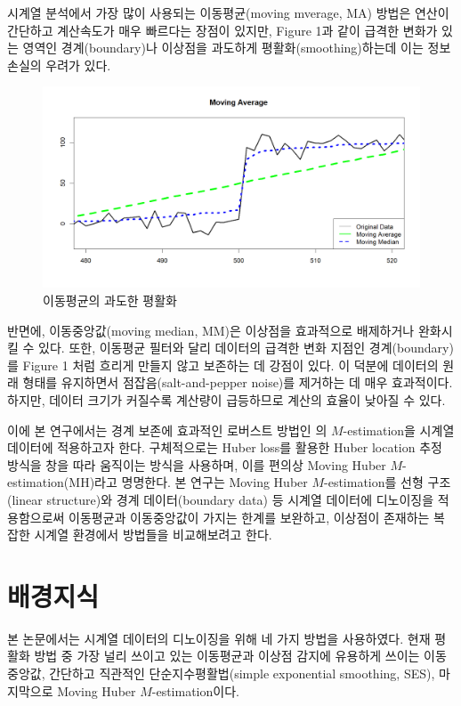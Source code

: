 \documentclass[letterpaper,12pt]{article}
\begin{document}
{시계열 분석에서 가장 많이 사용되는 이동평균(moving mverage, MA) 방법은 연산이 간단하고 계산속도가 매우 빠르다는 장점이 있지만, Figure 1과 같이 급격한 변화가 있는 영역인 경계(boundary)나 이상점을 과도하게 평활화(smoothing)하는데 이는 정보 손실의 우려가 있다.
\begin{figure}[H]
    \centering
    \includegraphics[width=0.8\linewidth]{figures/MAMM.png}
    \caption{이동평균의 과도한 평활화}
\end{figure}
반면에, 이동중앙값(moving median, MM)은 이상점을 효과적으로 배제하거나 완화시킬 수 있다. 또한, 이동평균 필터와 달리 데이터의 급격한 변화 지점인 경계(boundary)를  Figure 1 처럼 흐리게 만들지 않고 보존하는 데 강점이 있다. 이 덕분에 데이터의 원래 형태를 유지하면서 점잡음(salt-and-pepper noise)를 제거하는 데 매우 효과적이다. 하지만, 데이터 크기가 커질수록 계산량이 급등하므로 계산의 효율이 낮아질 수 있다\citep{huang1979fast}.

이에 본 연구에서는 경계 보존에 효과적인 로버스트 방법인 \citet{huber1981robust}의 $M$-estimation을 시계열 데이터에 적용하고자 한다. 구체적으로는 Huber loss를 활용한 Huber location 추정 방식을 창을 따라 움직이는 방식을 사용하며, 이를 편의상 Moving Huber $M$-estimation(MH)라고 명명한다. 본 연구는 Moving Huber $M$-estimation를 선형 구조(linear structure)와 경계 데이터(boundary data) 등 시계열 데이터에 디노이징을 적용함으로써 이동평균과 이동중앙값이 가지는 한계를 보완하고, 이상점이 존재하는 복잡한 시계열 환경에서 방법들을 비교해보려고 한다.





\clearpage
\section{배경지식}\label{sec:setup}
본 논문에서는 시계열 데이터의 디노이징을 위해 네 가지 방법을 사용하였다. 현재 평활화 방법 중 가장 널리 쓰이고 있는 이동평균과 이상점 감지에 유용하게 쓰이는 이동중앙값, 간단하고 직관적인 단순지수평활법(simple exponential smoothing, SES), 마지막으로 Moving Huber $M$-estimation이다.

}
\end{document}
